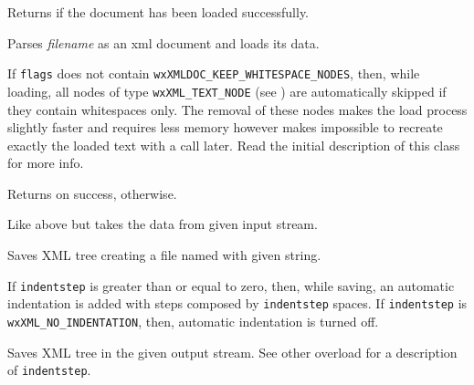 \label{wxxmldocumentisok}


Returns \true if the document has been loaded successfully.



\label{wxxmldocumentload}


Parses {\it filename} as an xml document and loads its data.

If {\tt flags} does not contain {\tt wxXMLDOC\_KEEP\_WHITESPACE\_NODES}, then, while loading, all nodes of
type {\tt wxXML\_TEXT\_NODE} (see ) are automatically skipped if they
contain whitespaces only.
The removal of these nodes makes the load process slightly faster and requires less memory however
makes impossible to recreate exactly the loaded text with a  call later.
Read the initial description of this class for more info.

Returns \true on success, \false otherwise.


Like above but takes the data from given input stream.


\label{wxxmldocumentsave}


Saves XML tree creating a file named with given string.

If {\tt indentstep} is greater than or equal to zero, then, while saving, an automatic indentation
is added with steps composed by {\tt indentstep} spaces.
If {\tt indentstep} is {\tt wxXML\_NO\_INDENTATION}, then, automatic indentation is turned off.


Saves XML tree in the given output stream. See other overload for a description of {\tt indentstep}.


\label{wxxmldocumentsetencoding}


